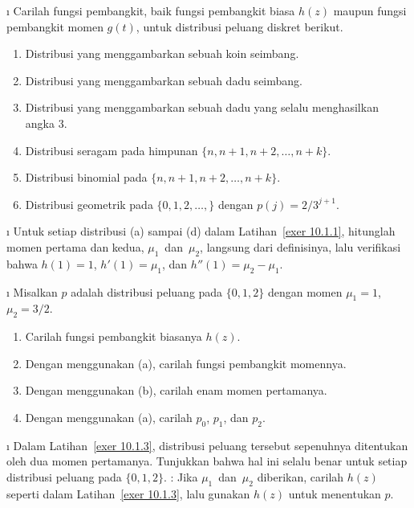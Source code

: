 \exercises
\begin{LJSItem}


\i\label{exer 10.1.1} Carilah fungsi pembangkit, baik fungsi pembangkit biasa $h(z)$
maupun fungsi pembangkit momen $g(t)$, untuk distribusi peluang diskret berikut.
\begin{enumerate}
\item Distribusi yang menggambarkan sebuah koin seimbang.

\item Distribusi yang menggambarkan sebuah dadu seimbang.

\item Distribusi yang menggambarkan sebuah dadu yang selalu menghasilkan angka 3.

\item Distribusi seragam pada himpunan $\{n,n+1,n+2,\ldots,n+k\}$.

\item Distribusi binomial pada $\{n,n+1,n+2,\ldots,n+k\}$.

\item Distribusi geometrik pada $\{0,1,2,\ldots,\}$ dengan $p(j) = 2/3^{j + 1}$.
\end{enumerate}

\i\label{exer 10.1.2} Untuk setiap distribusi (a) sampai (d) dalam Latihan~\ref{exer
10.1.1}, hitunglah momen pertama dan kedua, $\mu_1$~dan~$\mu_2$, langsung dari
definisinya, lalu verifikasi bahwa $h(1) = 1$, $h'(1) = \mu_1$, dan $h''(1) = \mu_2 -
\mu_1$.

\i\label{exer 10.1.3} Misalkan $p$ adalah distribusi peluang pada $\{0,1,2\}$ dengan
momen $\mu_1 = 1$, $\mu_2 = 3/2$.
\begin{enumerate}
\item Carilah fungsi pembangkit biasanya $h(z)$.

\item Dengan menggunakan (a), carilah fungsi pembangkit momennya.

\item Dengan menggunakan (b), carilah enam momen pertamanya.

\item Dengan menggunakan (a), carilah $p_0$, $p_1$, dan $p_2$.
\end{enumerate}

\i\label{exer 10.1.4} Dalam Latihan~\ref{exer 10.1.3}, distribusi peluang tersebut 
sepenuhnya ditentukan oleh dua momen pertamanya.  Tunjukkan bahwa hal ini selalu benar untuk setiap
distribusi peluang pada $\{0,1,2\}$.  : Jika $\mu_1$~dan~$\mu_2$ diberikan,
carilah $h(z)$ seperti dalam Latihan~\ref{exer 10.1.3}, lalu gunakan $h(z)$ untuk menentukan $p$.


\end{LJSItem}
